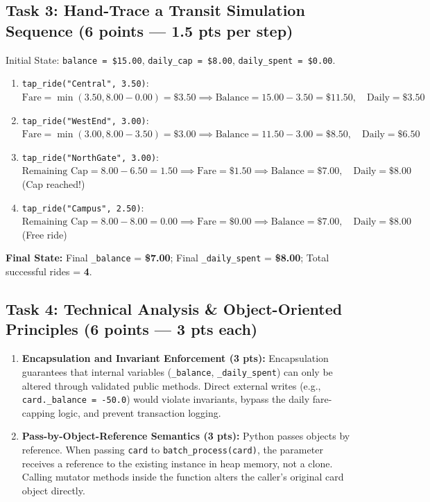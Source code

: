 \documentclass[11pt,a4paper]{article}
\begin{document}
\subsection*{Task 3: Hand-Trace a Transit Simulation Sequence (6 points --- 1.5 pts per step)}
Initial State: \texttt{balance = \$15.00}, \texttt{daily\_cap = \$8.00}, \texttt{daily\_spent = \$0.00}.
\begin{enumerate}[itemsep=1.5pt]
\item \texttt{tap\_ride("Central", 3.50)}:
  $\text{Fare} = \min(3.50, 8.00 - 0.00) = \mathbf{\$3.50} \implies \text{Balance} = 15.00 - 3.50 = \mathbf{\$11.50}, \quad \text{Daily} = \mathbf{\$3.50}$
\item \texttt{tap\_ride("WestEnd", 3.00)}:
  $\text{Fare} = \min(3.00, 8.00 - 3.50) = \mathbf{\$3.00} \implies \text{Balance} = 11.50 - 3.00 = \mathbf{\$8.50}, \quad \text{Daily} = \mathbf{\$6.50}$
\item \texttt{tap\_ride("NorthGate", 3.00)}:
  $\text{Remaining Cap} = 8.00 - 6.50 = 1.50 \implies \text{Fare} = \mathbf{\$1.50} \implies \text{Balance} = \mathbf{\$7.00}, \quad \text{Daily} = \mathbf{\$8.00}$ (Cap reached!)
\item \texttt{tap\_ride("Campus", 2.50)}:
  $\text{Remaining Cap} = 8.00 - 8.00 = 0.00 \implies \text{Fare} = \mathbf{\$0.00} \implies \text{Balance} = \mathbf{\$7.00}, \quad \text{Daily} = \mathbf{\$8.00}$ (Free ride)
\end{enumerate}
\textbf{Final State:} Final \texttt{\_balance} = \textbf{\$7.00}; Final \texttt{\_daily\_spent} = \textbf{\$8.00}; Total successful rides = \textbf{4}.

\subsection*{Task 4: Technical Analysis \& Object-Oriented Principles (6 points --- 3 pts each)}
\begin{enumerate}[label=\alph*),itemsep=1.5pt]
\item \textbf{Encapsulation and Invariant Enforcement (3 pts):}
  Encapsulation guarantees that internal variables (\texttt{\_balance}, \texttt{\_daily\_spent}) can only be altered through validated public methods. Direct external writes (e.g., \texttt{card.\_balance = -50.0}) would violate invariants, bypass the daily fare-capping logic, and prevent transaction logging.
\item \textbf{Pass-by-Object-Reference Semantics (3 pts):}
  Python passes objects by reference. When passing \texttt{card} to \texttt{batch\_process(card)}, the parameter receives a reference to the existing instance in heap memory, not a clone. Calling mutator methods inside the function alters the caller's original card object directly.
\end{enumerate}
\end{document}
